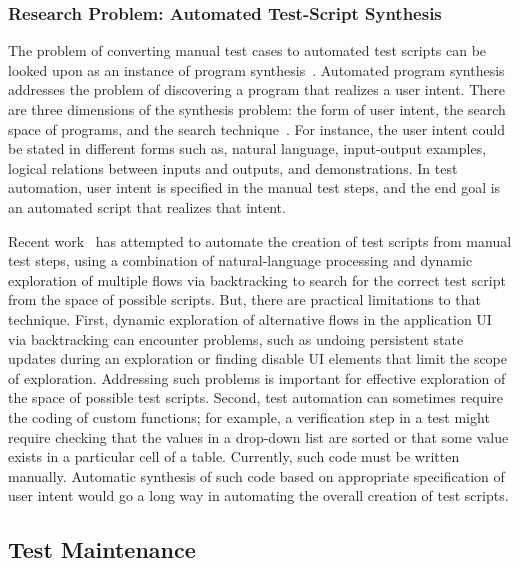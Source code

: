 
\subsubsection*{Research Problem: Automated Test-Script Synthesis}

The problem of converting manual test cases to automated test scripts can be
looked upon as an instance of program synthesis~\cite{Gulwani:2010}.  Automated
program synthesis addresses the problem of discovering a program that realizes a
user intent. There are three dimensions of the synthesis problem: the form of
user intent, the search space of programs, and the search
technique~\cite{Gulwani:2010}. For instance, the user intent could be stated in
different forms such as, natural language, input-output examples, logical
relations between inputs and outputs, and demonstrations. In test automation,
user intent is specified in the manual test steps, and the end goal is an
automated script that realizes that intent.

Recent work~\cite{thummalapenta:2012a} has attempted to automate the creation of
test scripts from manual test steps, using a combination of natural-language
processing and dynamic exploration of multiple flows via backtracking to search
for the correct test script from the space of possible scripts. But, there are
practical limitations to that technique. First, dynamic exploration of
alternative flows in the application UI via backtracking can encounter problems,
such as undoing persistent state updates during an exploration or finding
disable UI elements that limit the scope of exploration. Addressing such
problems is important for effective exploration of the space of possible test
scripts.  Second, test automation can sometimes require the coding of custom
functions; for example, a verification step in a test might require checking
that the values in a drop-down list are sorted or that some value exists in a
particular cell of a table. Currently, such code must be written
manually. Automatic synthesis of such code based on appropriate specification of
user intent would go a long way in automating the overall creation of test
scripts.

\subsection{Test Maintenance}
\label{sec:test-maintenance}

